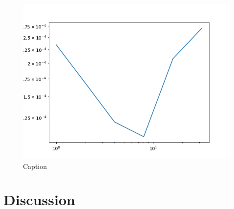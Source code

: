 \documentclass[11pt]{article}
\begin{document}
\begin{figure}
    \centering
    \includegraphics{julia_code/2D/MPI/sphere/julia_MPI_2D.png}
    \caption{Caption}
    \label{fig:my_label}
\end{figure}

\section{Discussion}
\printbibliography %
\end{document}
